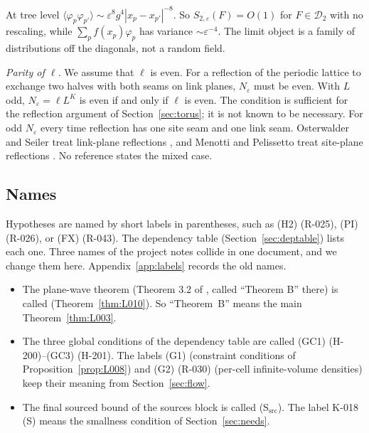 \begin{remark}[scaling]
At tree level $\langle\varphi_p\varphi_{p'}\rangle\sim\varepsilon^8g^4|x_p-x_{p'}|^{-8}$. So $S_{2,\varepsilon}(F)=O(1)$ for $F\in\mathcal D_2$ with no rescaling, while $\sum_pf(x_p)\varphi_p$ has variance $\sim\varepsilon^{-4}$. The limit object is a family of distributions off the diagonals, not a random field.
\end{remark}

\emph{Parity of $\ell$.} We assume that $\ell$ is even. For a reflection of the periodic lattice to exchange two halves with both seams on link planes, $N_\varepsilon$ must be even. With $L$ odd, $N_\varepsilon=\ell L^K$ is even if and only if $\ell$ is even. The condition is sufficient for the reflection argument of Section~\ref{sec:torus}; it is not known to be necessary. For odd $N_\varepsilon$ every time reflection has one site seam and one link seam. Osterwalder and Seiler treat link-plane reflections \cite{osterwalderseiler1978}, and Menotti and Pelissetto treat site-plane reflections \cite{menottipelissetto1987}. No reference states the mixed case.

\subsection{Names}\label{sec:names}

Hypotheses are named by short labels in parentheses, such as (H2) (R-025), (PI) (R-026), or (FX) (R-043). The dependency table (Section~\ref{sec:deptable}) lists each one. Three names of the project notes collide in one document, and we change them here. Appendix~\ref{app:labels} records the old names.
\begin{itemize}
\item The plane-wave theorem (Theorem 3.2 of , called ``Theorem B'' there) is called \ThmPW{} (Theorem~\ref{thm:L010}). So ``Theorem~B'' means the main Theorem~\ref{thm:L003}.
\item The three global conditions of the dependency table are called (GC1) (H-200)--(GC3) (H-201). The labels (G1) (constraint conditions of Proposition~\ref{prop:L008}) and (G2) (R-030) (per-cell infinite-volume densities) keep their meaning from Section~\ref{sec:flow}.
\item The final sourced bound of the sources block is called (S$_{\mathrm{src}}$). The label K-018 (S) means the smallness condition of Section~\ref{sec:needs}.
\end{itemize}
